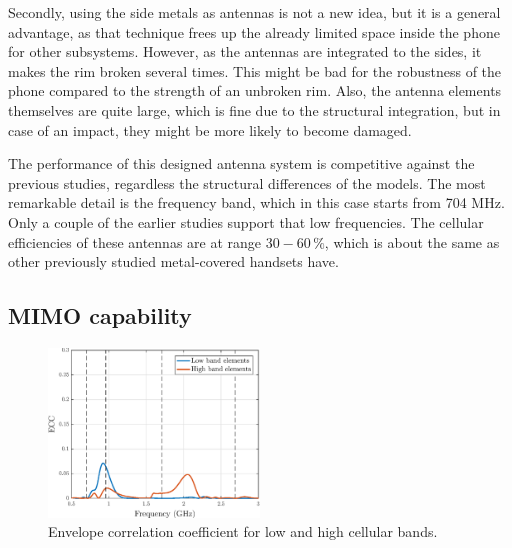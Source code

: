 Secondly, using the side metals as antennas is not a new idea, but it is a general advantage, as that technique frees up the already limited space inside the phone for other subsystems. However, as the antennas are integrated to the sides, it makes the rim broken several times. This might be bad for the robustness of the phone compared to the strength of an unbroken rim. Also, the antenna elements themselves are quite large, which is fine due to the structural integration, but in case of an impact, they might be more likely to become damaged.

The performance of this designed antenna system is competitive against the previous studies, regardless the structural differences of the models. The most remarkable detail is the frequency band, which in this case starts from 704 MHz. Only a couple of the earlier studies support that low frequencies. The cellular efficiencies of these antennas are at range $30-60\,\%$, which is about the same as other previously studied metal-covered handsets have. 


\subsection{MIMO capability}
\label{sec:mimo_cap}

\begin{figure}[H]
    \centering
    \includegraphics[width=0.5\textwidth]{img/ecc.eps}
    \caption{Envelope correlation coefficient for low and high cellular bands.}
    \label{fig:ecc}
\end{figure}


